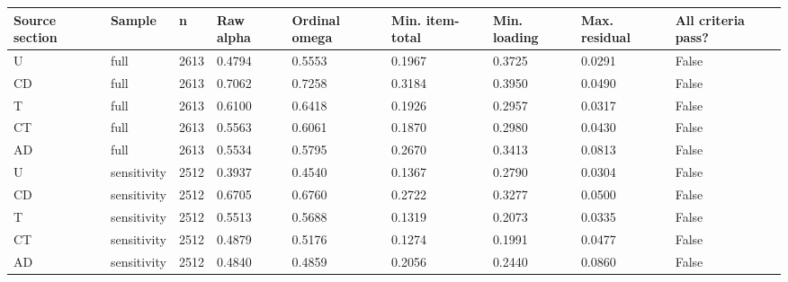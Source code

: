 \begin{tabular}{lllllllll}
\toprule
Source section & Sample & n & Raw alpha & Ordinal omega & Min. item-total & Min. loading & Max. residual & All criteria pass? \\
\midrule
U & full & 2613 & 0.4794 & 0.5553 & 0.1967 & 0.3725 & 0.0291 & False \\
CD & full & 2613 & 0.7062 & 0.7258 & 0.3184 & 0.3950 & 0.0490 & False \\
T & full & 2613 & 0.6100 & 0.6418 & 0.1926 & 0.2957 & 0.0317 & False \\
CT & full & 2613 & 0.5563 & 0.6061 & 0.1870 & 0.2980 & 0.0430 & False \\
AD & full & 2613 & 0.5534 & 0.5795 & 0.2670 & 0.3413 & 0.0813 & False \\
U & sensitivity & 2512 & 0.3937 & 0.4540 & 0.1367 & 0.2790 & 0.0304 & False \\
CD & sensitivity & 2512 & 0.6705 & 0.6760 & 0.2722 & 0.3277 & 0.0500 & False \\
T & sensitivity & 2512 & 0.5513 & 0.5688 & 0.1319 & 0.2073 & 0.0335 & False \\
CT & sensitivity & 2512 & 0.4879 & 0.5176 & 0.1274 & 0.1991 & 0.0477 & False \\
AD & sensitivity & 2512 & 0.4840 & 0.4859 & 0.2056 & 0.2440 & 0.0860 & False \\
\bottomrule
\end{tabular}
